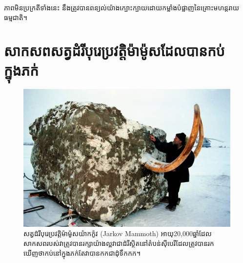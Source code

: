 \documentclass[10pt,twocolumn,letterpaper]{article}
\begin{document}
ភាពមិនប្រក្រតីទាំងនេះ នឹងត្រូវបានពន្យល់យ៉ាងក្បោះក្បាយដោយកម្លាំងបំផ្លាញនៃគ្រោះមហន្តរាយធម្មជាតិ។

\section{សាកសពសត្វដំរីបុរេប្រវត្តិម៉ាម៉ូសដែលបានកប់ក្នុងភក់}
\begin{figure}[t]
\begin{center}
   \includegraphics[width=1\linewidth]{jarkov-mammoth.jpg}
\end{center}
   \caption{សត្វដំរីបុរេប្រវត្តិម៉ាម៉ូសយ៉ាកក៉ូវ (Jarkov Mammoth) អាយុ20,000ឆ្នាំដែលសាកសពរបស់វាត្រូវបានរក្សាយ៉ាងល្អ​វាជាដំរីស្ថិតនៅតំបន់ស៊ីបេរីដែលត្រូវបានរកឃើញថាកប់នៅក្នុងភក់តែវាបានកកជាដុំទឹកកក\cite{51}។}
\label{fig:1}
\label{fig:onecol}
\end{figure}
\end{document}

